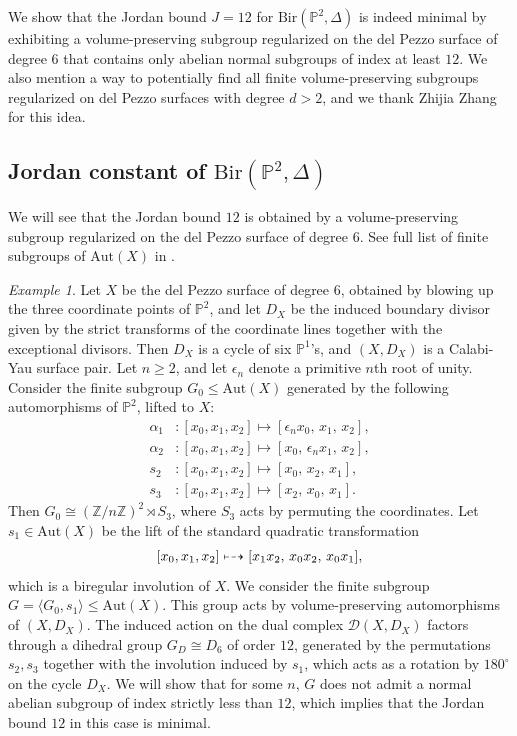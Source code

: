 \documentclass[a4paper,12pt,oneside]{amsart}
\numberwithin{equation}{section}
\theoremstyle{definition}
\theoremstyle{remark}
\newtheorem{example}[theorem]{Example}
\newcommand{\Ptwo}{\mathbb{P}^2}
\newcommand{\Bir}{\mathrm{Bir}}
\newcommand{\Aut}{\mathrm{Aut}}
\begin{document}
We show that the Jordan bound $J = 12$ for $\Bir(\Ptwo, \Delta)$ is indeed minimal by exhibiting a volume-preserving subgroup regularized on the del Pezzo surface of degree 6 that contains only abelian normal subgroups of index at least $12$. We also mention a way to potentially find all finite volume-preserving subgroups regularized on del Pezzo surfaces with degree $d>2$, and we thank Zhijia Zhang for this idea.
\subsection{Jordan constant of $\Bir(\Ptwo, \Delta)$}
We will see that the Jordan bound $12$ is obtained by a volume-preserving subgroup regularized on the del Pezzo surface of degree 6. See full list of finite subgroups of $\Aut(X)$ in \cite[Theorem 4.7]{dolgachev2009finitesubgroupsplanecremona}.

\begin{example}
Let $X$ be the del Pezzo surface of degree $6$, obtained by blowing up the three
coordinate points of $\mathbb P^2$, and let $D_X$ be the induced boundary divisor
given by the strict transforms of the coordinate lines together with the exceptional
divisors. Then $D_X$ is a cycle of six $\mathbb P^1$'s, and $(X,D_X)$ is a Calabi-Yau
surface pair.
Let $n\ge 2$, and let $\epsilon_n$ denote a primitive $n$th root of unity.
Consider the finite subgroup $G_0\leqslant \Aut(X)$ generated by the following
automorphisms of $\mathbb P^2$, lifted to $X$:
\[
\begin{aligned}
\alpha_1 &\colon [x_0,x_1,x_2] \mapsto [\epsilon_n x_0,\, x_1,\, x_2],\\
\alpha_2 &\colon [x_0,x_1,x_2] \mapsto [x_0,\, \epsilon_n x_1,\, x_2],\\
s_2 &\colon [x_0,x_1,x_2] \mapsto [x_0,\, x_2,\, x_1],\\
s_3 &\colon [x_0,x_1,x_2] \mapsto [x_2,\, x_0,\, x_1].
\end{aligned}
\]
Then $G_0 \cong (\mathbb Z/n\mathbb Z)^2 \rtimes S_3$, where $S_3$ acts by permuting
the coordinates.
Let $s_1\in \Aut(X)$ be the lift of the standard quadratic transformation
\[
[x_0,x_1,x_2] \mathrel{\mapstochar\dashrightarrow} [x_1x_2,\, x_0x_2,\, x_0x_1],
\]
which is a biregular involution of $X$.
We consider the finite subgroup $G = \langle G_0, s_1\rangle \leqslant \Aut(X)$.
This group acts by volume-preserving
automorphisms of $(X,D_X)$.
The induced action on the dual complex $\mathcal D(X,D_X)$ factors through a
dihedral group $G_D \cong D_6$ of order $12$, generated by the permutations
$s_2,s_3$ together with the involution induced by $s_1$, which acts as a rotation
by $180^\circ$ on the cycle $D_X$.
We will show that for some $n$, $G$ does not admit a normal abelian subgroup
of index strictly less than $12$, which implies that the Jordan bound $12$ in this
case is minimal.
\end{example}
\end{document}
